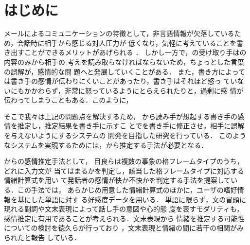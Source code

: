 \documentclass[japanese]{jnlp_1.4}
\def\resp#1{}
\def\respeqn#1{}
\begin{document}
\maketitle


\section{はじめに}

\resp{コミュニケーションの手段として，メールやWebの掲示板を日常的に利用するシー
ンは非常に多い．}
メール\resp{やWebの掲示板}によるコミュニケーションの特徴として，非言語情報が欠落しているため，会話時に相手から感じる対人圧力が
低くなり，気軽に考えていることを書き出すことができるメリットがあげられる
\cite{sugitani20070320}．
しかし一方で，\resp{メッセージ}の受け取り手は\resp{テキスト}の内容のみから相手の
考えを読み取らなければならないため，ちょっとした言葉の誤解が，感情的な問
題へと発展していくことがある\cite{小林正幸}．
また，書き方によっては書き手の感情が伝わりにくいことがあったり\cite{katou20051020}，書き手はそれほど怒っ
ていないにもかかわらず，非常に怒っているようにとらえられたりと，過剰に感
情が伝わってしまうこともある\cite{小林正幸}．このように，\resp{書き手が思っている程，伝えたいこ
とが相手に伝わらない傾向があるため{\cite{citeulike:528278}}，メールやWeb
の掲示板では相手に誤解を与えやすいというデメリットを持っているといえる．}

そこで我々は上記の問題点を解決するため，
\respeqn{テキスト}から読み手が想起する書き手の感情を推定し，推定結果を書き手に示すこ
とで\resp{テキスト}を書き手に修正させ，相手に誤解を与えないようにするシステムの
開発を目指した研究を行っている．
このようなシステムを実現するためには，\resp{読み手が想起する書き手の感情をテキ
スト中の発話文}から推定する手法が必要となる．

\respeqn{発話文}からの感情推定手法として，
目良らは複数の事象の格フレームタイプのうち，どれに入力文が
当てはまるかを判定し，該当した格フレームタイプに対応する情緒計算式を用い
て発話者の感情が快か不快かを判定する手法を提案している\cite{mera}．この手法では，
あらかじめ用意した情緒計算式のほかに，ユーザの嗜好情報を基にした単語に対す
る好感度データを用いる．
単語に限らず，文の冒頭に現れる副詞や文末表現によって話し手の意図や心的態
度を表すモダリティ\cite{modality2}も，感情推定に有用であることが考えられる．文末表現から
情緒を推定する可能性についての検討を徳久らが行っており
\cite{徳久雅人:20080131}，文末表現と情緒の間に若干の相関がみられたと報告
している．
\end{document}
